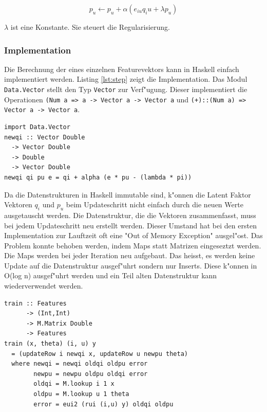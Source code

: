\documentclass[a4paper, 12pt]{article}
\begin{document}
\begin{equation}
  \label{eq:assign3}
    p_u \leftarrow p_u + \alpha (e_{iu} q_iu + \lambda p_u)
\end{equation}

$\lambda$ ist eine Konstante. Sie steuert die Regularisierung. 

\subsubsection{Implementation}
\label{sec:sgdimpl}

Die Berechnung der eines einzelnen Featurevektors kann in Haskell einfach implementiert werden. Listing \ref{lst:step} zeigt die Implementation. Das Modul \verb|Data.Vector| stellt den Typ \verb|Vector| zur Verf"ugung. Dieser implementiert die Operationen \verb|(Num a => a -> Vector a -> Vector a| und \verb|(+)::(Num a) => Vector a -> Vector a|.

\begin{lstlisting}[caption=Berechnung eines Featurevektors, label={lst:step}]
import Data.Vector 
newqi :: Vector Double
  -> Vector Double
  -> Double
  -> Vector Double
newqi qi pu e = qi + alpha (e * pu - (lambda * pi))
\end{lstlisting}

Da die Datenstrukturen in Haskell immutable sind, k"onnen die Latent Faktor Vektoren $q_i$ und $p_u$ beim Updateschritt nicht einfach durch die neuen Werte ausgetauscht werden. Die Datenstruktur, die die Vektoren zusammenfasst, muss bei jedem Updateschritt neu erstellt werden. Dieser Umstand hat bei den ersten Implementation zur Lauftzeit oft eine "Out of Memory Exception" ausgel"ost. Das Problem konnte behoben werden, indem Maps statt Matrizen eingeseztzt werden. Die Maps werden bei jeder Iteration neu aufgebaut. Das heisst, es werden keine Update auf die Datenstruktur ausgef"uhrt sondern nur Inserts. Diese k"onnen in O(log n) ausgef"uhrt werden und ein Teil alten Datenstruktur kann wiederverwendet werden.

\begin{lstlisting}[caption=Implementation Funk SGD, label=lst:sgd] 
train :: Features
      -> (Int,Int) 
      -> M.Matrix Double 
      -> Features
train (x, theta) (i, u) y
  = (updateRow i newqi x, updateRow u newpu theta)
  where newqi = newqi oldqi oldpu error
        newpu = newpu oldpu oldqi error
        oldqi = M.lookup i 1 x
        oldpu = M.lookup u 1 theta
        error = eui2 (rui (i,u) y) oldqi oldpu  
\end{lstlisting}
\end{document}
